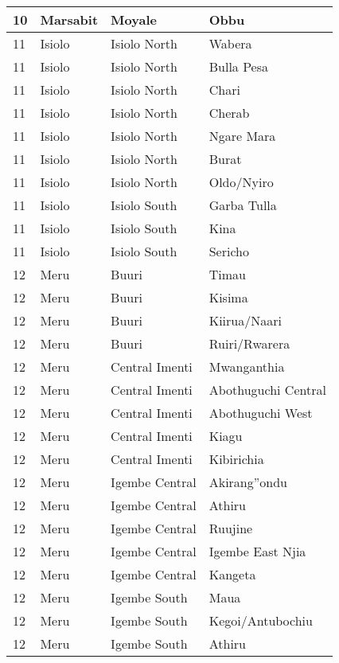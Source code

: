 \begin{table}[!ht]
\begin{tabular}{|l|l|l|l|}
        10 & Marsabit & Moyale & Obbu \\ \hline
        11 & Isiolo & Isiolo North & Wabera \\ \hline
        11 & Isiolo & Isiolo North & Bulla Pesa \\ \hline
        11 & Isiolo & Isiolo North & Chari \\ \hline
        11 & Isiolo & Isiolo North & Cherab \\ \hline
        11 & Isiolo & Isiolo North & Ngare Mara \\ \hline
        11 & Isiolo & Isiolo North & Burat \\ \hline
        11 & Isiolo & Isiolo North & Oldo/Nyiro \\ \hline
        11 & Isiolo & Isiolo South & Garba Tulla \\ \hline
        11 & Isiolo & Isiolo South & Kina \\ \hline
        11 & Isiolo & Isiolo South & Sericho \\ \hline
        12 & Meru & Buuri & Timau \\ \hline
        12 & Meru & Buuri & Kisima \\ \hline
        12 & Meru & Buuri & Kiirua/Naari \\ \hline
        12 & Meru & Buuri & Ruiri/Rwarera \\ \hline
        12 & Meru & Central Imenti & Mwanganthia \\ \hline
        12 & Meru & Central Imenti & Abothuguchi Central \\ \hline
        12 & Meru & Central Imenti & Abothuguchi West \\ \hline
        12 & Meru & Central Imenti & Kiagu \\ \hline
        12 & Meru & Central Imenti & Kibirichia \\ \hline
        12 & Meru & Igembe Central & Akirang''ondu \\ \hline
        12 & Meru & Igembe Central & Athiru \\ \hline
        12 & Meru & Igembe Central & Ruujine \\ \hline
        12 & Meru & Igembe Central & Igembe East Njia \\ \hline
        12 & Meru & Igembe Central & Kangeta \\ \hline
        12 & Meru & Igembe South & Maua \\ \hline
        12 & Meru & Igembe South & Kegoi/Antubochiu \\ \hline
        12 & Meru & Igembe South & Athiru \\ \hline

\end{tabular}
\end{table}
